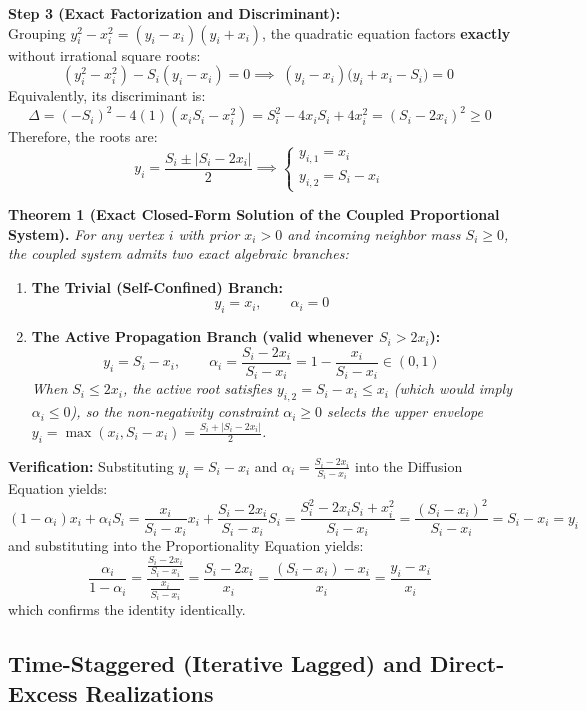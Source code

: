 \documentclass[11pt, a4paper]{article}
\begin{document}
\vspace{0.2cm}
\noindent\textbf{Step 3 (Exact Factorization and Discriminant):} \\
Grouping $y_i^2 - x_i^2 = (y_i - x_i)(y_i + x_i)$, the quadratic equation factors \textbf{exactly} without irrational square roots:
\[
(y_i^2 - x_i^2) - S_i(y_i - x_i) = 0 \implies \boxed{\;(y_i - x_i)\big(y_i + x_i - S_i\big) = 0\;}
\]
Equivalently, its discriminant is:
\[
\Delta = (-S_i)^2 - 4(1)(x_i S_i - x_i^2) = S_i^2 - 4 x_i S_i + 4 x_i^2 = (S_i - 2x_i)^2 \ge 0
\]
Therefore, the roots are:
\[
y_i = \frac{S_i \pm |S_i - 2x_i|}{2} \implies \begin{cases} y_{i,1} = x_i \\[6pt] y_{i,2} = S_i - x_i \end{cases}
\]

\noindent\textbf{Theorem 1 (Exact Closed-Form Solution of the Coupled Proportional System).} \textit{For any vertex $i$ with prior $x_i > 0$ and incoming neighbor mass $S_i \ge 0$, the coupled system admits two exact algebraic branches:}
\begin{enumerate}
    \item \textbf{The Trivial (Self-Confined) Branch:}
    \[
    y_i = x_i, \qquad \alpha_i = 0
    \]
    \item \textbf{The Active Propagation Branch (valid whenever $S_i > 2x_i$):}
    \[
    \boxed{\;y_i = S_i - x_i, \qquad \alpha_i = \frac{S_i - 2x_i}{S_i - x_i} = 1 - \frac{x_i}{S_i - x_i} \in (0, 1)\;}
    \]
    \textit{When $S_i \le 2x_i$, the active root satisfies $y_{i,2} = S_i - x_i \le x_i$ (which would imply $\alpha_i \le 0$), so the non-negativity constraint $\alpha_i \ge 0$ selects the upper envelope $y_i = \max(x_i, S_i - x_i) = \frac{S_i + |S_i - 2x_i|}{2}$.}
\end{enumerate}

\noindent\textbf{Verification:} Substituting $y_i = S_i - x_i$ and $\alpha_i = \frac{S_i - 2x_i}{S_i - x_i}$ into the Diffusion Equation yields:
\[
(1 - \alpha_i)x_i + \alpha_i S_i = \frac{x_i}{S_i - x_i} x_i + \frac{S_i - 2x_i}{S_i - x_i} S_i = \frac{S_i^2 - 2x_i S_i + x_i^2}{S_i - x_i} = \frac{(S_i - x_i)^2}{S_i - x_i} = S_i - x_i = y_i
\]
and substituting into the Proportionality Equation yields:
\[
\frac{\alpha_i}{1 - \alpha_i} = \frac{\frac{S_i - 2x_i}{S_i - x_i}}{\frac{x_i}{S_i - x_i}} = \frac{S_i - 2x_i}{x_i} = \frac{(S_i - x_i) - x_i}{x_i} = \frac{y_i - x_i}{x_i}
\]
which confirms the identity identically.

\subsection{Time-Staggered (Iterative Lagged) and Direct-Excess Realizations}
\end{document}
